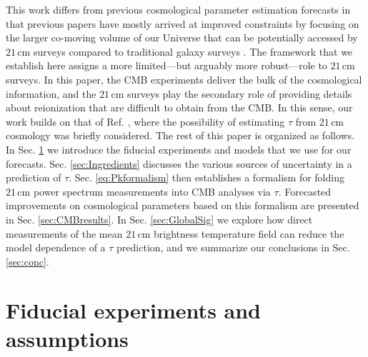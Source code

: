 \documentclass[twocolumn,aps,prd,nofootinbib,showpacs,superscriptaddress]{revtex4-1}
\begin{document}
This work differs from previous cosmological parameter estimation forecasts in that previous papers have mostly arrived at improved constraints by focusing on the larger co-moving volume of our Universe that can be potentially accessed by $21\,\textrm{cm}$ surveys compared to traditional galaxy surveys \cite{mcquinn_et_al2006,bowman_et_al2007,mao_et_al2008,loeb_and_wyithe2008,tegmark_and_zaldarriaga2009,barger_et_al2009,visbal_et_al2009,clesse_et_al2012,oyama_et_al2013,bull_et_al2015}. The framework that we establish here assigns a more limited---but arguably more robust---role to $21\,\textrm{cm}$ surveys. In this paper, the CMB experiments deliver the bulk of the cosmological information, and the $21\,\textrm{cm}$ surveys play the secondary role of providing details about reionization that are difficult to obtain from the CMB. In this sense, our work builds on that of Ref. \cite{pritchard_et_al2010}, where the possibility of estimating $\tau$ from $21\,\textrm{cm}$ cosmology was briefly considered. The rest of this paper is organized as follows. In Sec. \ref{sec:fidExpt} we introduce the fiducial experiments and models that we use for our forecasts. Sec. \ref{sec:Ingredients} discusses the various sources of uncertainty in a prediction of $\tau$. Sec. \ref{eq:Pkformalism} then establishes a formalism for folding $21\,\textrm{cm}$ power spectrum measurements into CMB analyses via $\tau$. Forecasted improvements on cosmological parameters based on this formalism are presented in Sec. \ref{sec:CMBresults}. In Sec. \ref{sec:GlobalSig} we explore how direct measurements of the mean $21\,\textrm{cm}$ brightness temperature field can reduce the model dependence of a $\tau$ prediction, and we summarize our conclusions in Sec. \ref{sec:conc}.

\section{Fiducial experiments and assumptions}
\label{sec:fidExpt}
\end{document}
